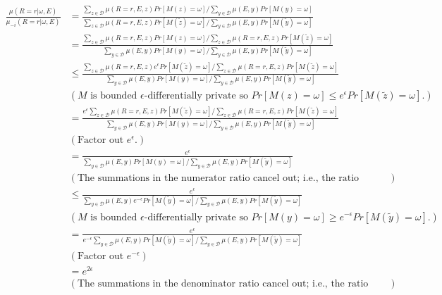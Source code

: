 \begin{align*}
    \frac{\mu(R=r | \omega, E)}{\mu_{-i}(R=r | \omega, E)} &=
    \frac{\sum_{z \in \mathcal{D}}\mu(R=r, E, z) Pr[M(z)=\omega]/\sum_{y \in \mathcal{D}}\mu(E, y)Pr[M(y)=\omega]}{\sum_{z \in \mathcal{D}}\mu(R=r, E, z) Pr[M(\tilde{z})=\omega] / \sum_{y \in \mathcal{D}}\mu(E, y)Pr[M(\tilde{y})=\omega]}\\
    &= 
    \frac{\sum_{z \in \mathcal{D}}\mu(R=r, E, z) Pr[M(z)=\omega] / \sum_{z \in \mathcal{D}}\mu(R=r, E, z) Pr[M(\tilde{z})=\omega] }{\sum_{y \in \mathcal{D}}\mu(E, y)Pr[M(y)=\omega] / \sum_{y \in \mathcal{D}}\mu(E, y)Pr[M(\tilde{y})=\omega] } \\
    &\leq
    \frac{\sum_{z \in \mathcal{D}}\mu(R=r, E, z)e^{\epsilon} Pr[M(\tilde{z})=\omega] / \sum_{z \in \mathcal{D}}\mu(R=r, E, z) Pr[M(\tilde{z})=\omega] }{\sum_{y \in \mathcal{D}}\mu(E, y)Pr[M(y)=\omega] / \sum_{y \in \mathcal{D}}\mu(E, y)Pr[M(\tilde{y})=\omega] } \\
    &(\text{$M$ is bounded $\epsilon$-differentially private so $Pr[M(z)= \omega] \leq e^\epsilon Pr[M(\tilde{z}) = \omega]$.}) \\
    &=
    \frac{e^\epsilon\sum_{z \in \mathcal{D}}\mu(R=r, E, z) Pr[M(\tilde{z})=\omega] / \sum_{z \in \mathcal{D}}\mu(R=r, E, z) Pr[M(\tilde{z})=\omega] }{\sum_{y \in \mathcal{D}}\mu(E, y)Pr[M(y)=\omega] / \sum_{y \in \mathcal{D}}\mu(E, y)Pr[M(\tilde{y})=\omega] } \\
    &(\text{Factor out $e^\epsilon$.}) \\
    &=
    \frac{e^\epsilon}{\sum_{y \in \mathcal{D}}\mu(E, y)Pr[M(y)=\omega] / \sum_{y \in \mathcal{D}}\mu(E, y)Pr[M(\tilde{y})=\omega] } \\
    &(\text{The summations in the numerator ratio cancel out; i.e., the ratio equals 1.}) \\
    &\leq
    \frac{e^\epsilon}{\sum_{y \in \mathcal{D}}\mu(E, y)e^{-\epsilon}Pr[M(\tilde{y})=\omega] / \sum_{y \in \mathcal{D}}\mu(E, y)Pr[M(\tilde{y})=\omega] } \\
    &(\text{$M$ is bounded $\epsilon$-differentially private so $Pr[M(y)= \omega] \geq e^{-\epsilon} Pr[M(\tilde{y}) = \omega]$.}) \\
    &=
    \frac{e^\epsilon}{e^{-\epsilon}\sum_{y \in \mathcal{D}}\mu(E, y)Pr[M(\tilde{y})=\omega] / \sum_{y \in \mathcal{D}}\mu(E, y)Pr[M(\tilde{y})=\omega] } \\
    &(\text{Factor out $e^{-\epsilon}$}) \\
    &=
    e^{2\epsilon} \\
    &(\text{The summations in the denominator ratio cancel out; i.e., the ratio equals 1.})
\end{align*}


